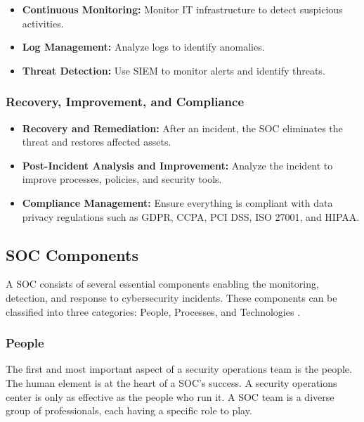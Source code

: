 \begin{itemize}
    \item \textbf{Continuous Monitoring:} Monitor IT infrastructure to detect suspicious activities.
    \item \textbf{Log Management:} Analyze logs to identify anomalies.
    \item \textbf{Threat Detection:} Use SIEM to monitor alerts and identify threats.
\end{itemize}

\subsubsection{Recovery, Improvement, and Compliance}

\begin{itemize}
    \item \textbf{Recovery and Remediation:} After an incident, the SOC eliminates the threat and restores affected assets.
    \item \textbf{Post-Incident Analysis and Improvement:} Analyze the incident to improve processes, policies, and security tools.
    \item \textbf{Compliance Management:} Ensure everything is compliant with data privacy regulations such as GDPR, CCPA, PCI DSS, ISO 27001, and HIPAA.
\end{itemize}

\subsection{SOC Components}
\label{subsec:soc-components}

A SOC consists of several essential components enabling the monitoring, detection, and response to cybersecurity incidents. These components can be classified into three categories: People, Processes, and Technologies \cite{ref34}.

\subsubsection{People}

The first and most important aspect of a security operations team is the people. The human element is at the heart of a SOC's success. A security operations center is only as effective as the people who run it. A SOC team is a diverse group of professionals, each having a specific role to play.

